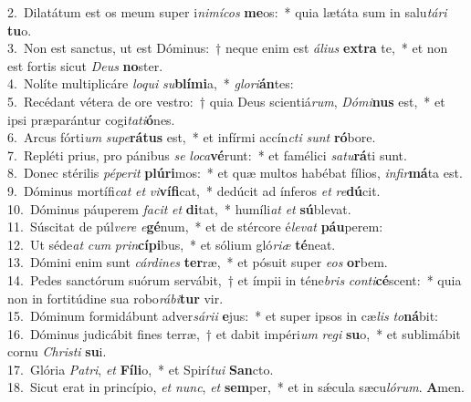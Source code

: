 {2.~}Dilatátum est os meum super i\textit{ni}\textit{mí}\textit{cos} \textbf{me}os:~* quia lætáta sum in salu\textit{tá}\textit{ri} \textbf{tu}o.\\
{3.~}Non est sanctus, ut est Dóminus:~† neque enim est \textit{á}\textit{li}\textit{us} \textbf{ex}\textbf{tra} te,~* et non est fortis sicut \textit{De}\textit{us} \textbf{no}ster.\\
{4.~}Nolíte multiplicáre \textit{lo}\textit{qui} \textit{su}\textbf{blí}\textbf{mi}a,~* \textit{glo}\textit{ri}\textbf{án}tes:\\
{5.~}Recédant vétera de ore vestro:~† quia Deus scientiá\textit{rum}, \textit{Dó}\textit{mi}\textbf{nus} est,~* et ipsi præparántur cogi\textit{ta}\textit{ti}\textbf{ó}nes.\\
{6.~}Arcus fórti\textit{um} \textit{su}\textit{pe}\textbf{rá}\textbf{tus} est,~* et infírmi accín\textit{cti} \textit{sunt} \textbf{ró}bore.\\
{7.~}Repléti prius, pro pánibus \textit{se} \textit{lo}\textit{ca}\textbf{vé}runt:~* et famélici \textit{sa}\textit{tu}\textbf{rá}ti sunt.\\
{8.~}Donec stérilis \textit{pé}\textit{pe}\textit{rit} \textbf{plú}\textbf{ri}mos:~* et quæ multos habébat fílios, \textit{in}\textit{fir}\textbf{má}ta est.\\
{9.~}Dóminus mortífi\textit{cat} \textit{et} \textit{vi}\textbf{ví}\textbf{fi}cat,~* dedúcit ad ínferos \textit{et} \textit{re}\textbf{dú}cit.\\
{10.~}Dóminus páuperem \textit{fa}\textit{cit} \textit{et} \textbf{di}tat,~* humíli\textit{at} \textit{et} \textbf{sú}blevat.\\
{11.~}Súscitat de púl\textit{ve}\textit{re} \textit{e}\textbf{gé}num,~* et de stércore é\textit{le}\textit{vat} \textbf{páu}perem:\\
{12.~}Ut séde\textit{at} \textit{cum} \textit{prin}\textbf{cí}\textbf{pi}bus,~* et sólium gló\textit{ri}\textit{æ} \textbf{té}neat.\\
{13.~}Dómini enim sunt \textit{cár}\textit{di}\textit{nes} \textbf{ter}ræ,~* et pósuit super \textit{e}\textit{os} \textbf{or}bem.\\
{14.~}Pedes sanctórum suórum servábit,~† et ímpii in téne\textit{bris} \textit{con}\textit{ti}\textbf{cé}scent:~* quia non in fortitúdine sua robo\textit{rá}\textit{bi}\textbf{tur} vir.\\
{15.~}Dóminum formidábunt adver\textit{sá}\textit{ri}\textit{i} \textbf{e}jus:~* et super ipsos in cæ\textit{lis} \textit{to}\textbf{ná}bit:\\
{16.~}Dóminus judicábit fines terræ,~† et dabit impéri\textit{um} \textit{re}\textit{gi} \textbf{su}o,~* et sublimábit cornu \textit{Chri}\textit{sti} \textbf{su}i.\\
{17.~}Glória \textit{Pa}\textit{tri}, \textit{et} \textbf{Fí}\textbf{li}o,~* et Spirí\textit{tu}\textit{i} \textbf{San}cto.\\
{18.~}Sicut erat in princípio, \textit{et} \textit{nunc}, \textit{et} \textbf{sem}per,~* et in sǽcula sæcu\textit{ló}\textit{rum}. \textbf{A}men.\\
